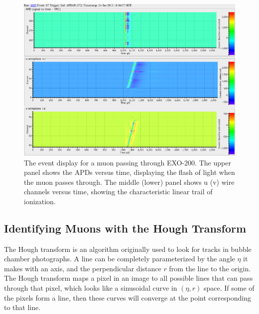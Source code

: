 \documentclass[herrin-thesis.tex]{subfiles}
\begin{document}
\begin{figure}[htp]
\centering
\includegraphics[width=1\columnwidth]{./plots/muon_eventdisplay_run_4685_ev_67.png}
\caption[A muon passing through EXO-200]{The event display for a muon passing through EXO-200. The upper panel shows the APDs versus time, displaying the flash of light when the muon passes through. The middle (lower) panel shows u (v) wire channels versus time, showing the characteristic linear trail of ionization.}
\label{fig:muon:eventdisplay}
\end{figure}

\subsection{Identifying Muons with the Hough Transform}
The Hough transform\cite{Hough:1959fk}\cite{Duda:1972:UHT:361237.361242} is an algorithm originally used to look for tracks in bubble chamber photographs. A line can be completely parameterized by the angle \(\eta\) it makes with an axis, and the perpendicular distance \(r\) from the line to the origin. The Hough transform maps a pixel in an image to all possible lines that can pass through that pixel, which looks like a sinusoidal curve in \((\eta, r)\) space. If some of the pixels form a line, then these curves will converge at the point corresponding to that line.
\end{document}
